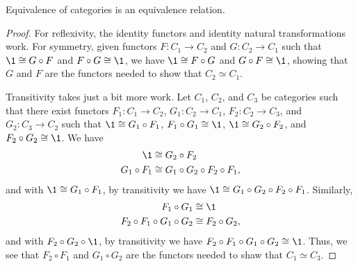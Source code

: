 \documentclass[../math.tex]{subfiles}
\begin{document}
\begin{theorem}
    Equivalence of categories is an equivalence relation.
\end{theorem}
\begin{proof}
    For reflexivity, the identity functors and identity natural transformations
    work.  For symmetry, given functors $F : C_1 \to C_2$ and $G : C_2 \to C_1$
    such that $\1 \cong G \circ F$ and $F \circ G \cong \1$, we have $\1 \cong F
    \circ G$ and $G \circ F \cong \1$, showing that $G$ and $F$ are the functors
    needed to show that $C_2 \simeq C_1$.

    Transitivity takes just a bit more work.  Let $C_1$, $C_2$, and $C_3$ be
    categories such that there exist functors $F_1 : C_1 \to C_2$, $G_1 : C_2
    \to C_1$, $F_2 : C_2 \to C_3$, and $G_2 : C_3 \to C_2$ such that $\1 \cong
    G_1 \circ F_1$, $F_1 \circ G_1 \cong \1$, $\1 \cong G_2 \circ F_2$, and $F_2
    \circ G_2 \cong \1$.  We have
    \begin{align*}
        \1 &\cong G_2 \circ F_2 \\
        G_1 \circ F_1 &\cong G_1 \circ G_2 \circ F_2 \circ F_1,
    \end{align*}
    and with $\1 \cong G_1 \circ F_1$, by transitivity we have $\1 \cong G_1
    \circ G_2 \circ F_2 \circ F_1$.  Similarly,
    \begin{align*}
        F_1 \circ G_1 &\cong \1 \\
        F_2 \circ F_1 \circ G_1 \circ G_2 &\cong F_2 \circ G_2,
    \end{align*}
    and with $F_2 \circ G_2 \circ \1$, by transitivity we have $F_2
    \circ F_1 \circ G_1 \circ G_2 \cong \1$.  Thus, we see that $F_2 \circ F_1$
    and $G_1 \circ G_2$ are the functors needed to shaw that $C_1 \simeq C_3$.
\end{proof}
\end{document}
